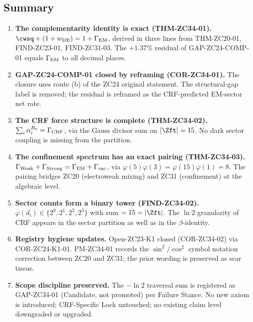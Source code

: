 \documentclass[12pt, a4paper]{article}
\begin{document}
\subsection{Summary}
\label{sec:summary}

\begin{enumerate}[leftmargin=*, label=\arabic*., noitemsep]

\item \textbf{The complementarity identity is exact
  (THM-ZC34-01).}
$\cwsq + (1+w_{\rm DE}) = 1 + \Gamma_{\rm EM}$, derived in
three lines from THM-ZC20-01, FIND-ZC23-01, FIND-ZC31-03.
The $+1.37\%$ residual of GAP-ZC24-COMP-01 equals $\Gamma_{\rm EM}$
to all decimal places.

\item \textbf{GAP-ZC24-COMP-01 closed by reframing
  (COR-ZC34-01).}
The closure uses route (b) of the ZC24 original statement.
The structural-gap label is removed; the residual is reframed
as the CRF-predicted EM-sector net rate.

\item \textbf{The CRF force structure is complete
  (THM-ZC34-02).}
$\sum_i \alpha_i^{R_0} = \Gamma_{\rm CRF}$, via the Gauss
divisor sum on $|\Zft| = 15$. No dark sector coupling is
missing from the partition.

\item \textbf{The confinement spectrum has an exact pairing
  (THM-ZC34-03).}
$\Gamma_{\rm Weak} + \Gamma_{\rm Strong} = \Gamma_{\rm EM}
+ \Gamma_{\rm vac}$, via $\varphi(5)\varphi(3) =
\varphi(15)\varphi(1) = 8$. The pairing bridges ZC20
(electroweak mixing) and ZC31 (confinement) at the algebraic
level.

\item \textbf{Sector counts form a binary tower (FIND-ZC34-02).}
$\varphi(d_i) \in \{2^0, 2^1, 2^2, 2^3\}$ with sum $= 15 =
|\Zft|$. The $\ln 2$ granularity of CRF appears in the sector
partition as well as in the $\beta$-identity.

\item \textbf{Registry hygiene updates.}
Open-ZC23-K1 closed (COR-ZC34-02) via COR-ZC24-K1-01.
PM-ZC34-01 records the $\sin^2/\cos^2$ symbol notation
correction between ZC20 and ZC31; the prior wording is
preserved as scar tissue.

\item \textbf{Scope discipline preserved.}
The $-\ln 2$ traversal sum is registered as GAP-ZC34-01
(Candidate, not promoted) per Failure Stance. No new axiom
is introduced; CRF-Specific Lock untouched; no existing
claim level downgraded or upgraded.

\end{enumerate}
\end{document}
